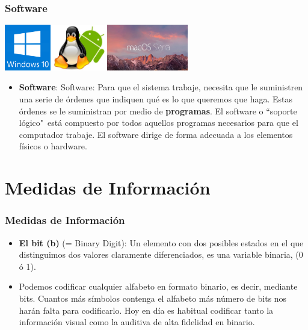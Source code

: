 \documentclass{beamer}
\begin{document}
\begin{frame}[fragile]\frametitle{Software}
\begin{center}
\includegraphics[height=2cm]{figs/Windows-10.png}\hfill\includegraphics[height=2cm]{figs/linux-android.jpg}\hfill\includegraphics[height=2cm]{figs/MacOS.jpg}
\end{center}
\begin{itemize}
\item \textbf{Software}: Software: Para que el sistema trabaje, necesita que le suministren una serie de órdenes que indiquen qué es lo que queremos que haga. Estas órdenes se le suministran por medio de \textbf{programas}. El software o ``soporte lógico"\, está compuesto por todos aquellos programas necesarios para que el computador trabaje. El software dirige de forma adecuada a los elementos físicos o hardware.
\end{itemize}
\end{frame}

\section{Medidas de Información}
\begin{frame}[fragile]\frametitle{Medidas de Información}
\begin{itemize}
\item \textbf{El bit (b)} (= Binary Digit): Un elemento con dos posibles estados en el que distinguimos dos valores claramente diferenciados, es una variable binaria, (0 ó 1).
\item Podemos codificar cualquier alfabeto en formato binario, es decir, mediante bits. Cuantos más símbolos contenga el alfabeto más número de bits nos harán falta para codificarlo. Hoy en día es habitual codificar tanto la información visual como la auditiva de alta fidelidad en binario.
\end{itemize}
\end{frame}
\end{document}
